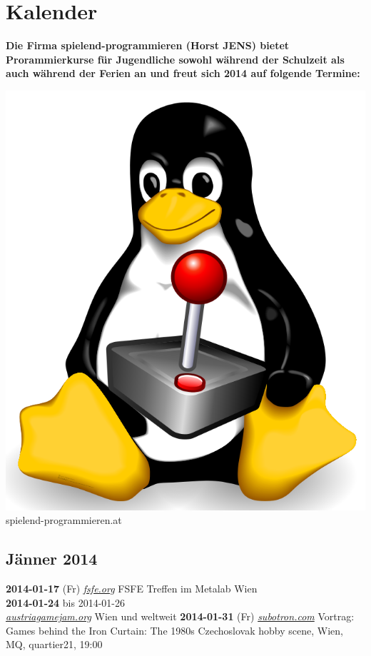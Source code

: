 \section*{Kalender}
\hypertarget{kalender}{}
\label{kalender}

\textbf{Die Firma spielend-programmieren (Horst JENS)  bietet Prorammierkurse für Jugendliche sowohl während der Schulzeit als auch während der Ferien an und freut sich 2014 auf folgende Termine:} 
\begin{center}
\includegraphics[width=0.9\linewidth]{kalender/tuxstick3.png}\\
\footnotesize{spielend-programmieren.at}
\end{center}
\subsection*{Jänner 2014}
\textbf{2014-01-17} (Fr) \href{http://fsfe.org}{\textit{fsfe.org}} FSFE Treffen im Metalab Wien\\
\textbf{2014-01-24} bis 2014-01-26\\ \href{http://austriagamejam.org/}{\textit{austriagamejam.org}} Wien und weltweit
\textbf{2014-01-31} (Fr) \href{http://subotron.com/veranstaltung/iron-curtain/}{\textit{subotron.com}} Vortrag: Games behind the Iron Curtain: The 1980s Czechoslovak hobby scene, Wien, MQ, quartier21, 19:00\\
